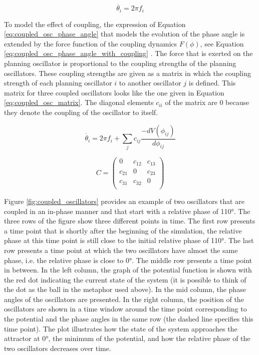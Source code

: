 \begin{equation}
\dot{\theta_i} =  2 \pi f_i
\label{eq:coupled_osc_phase_angle}
\end{equation}

To model the effect of coupling, the expression of Equation \ref{eq:coupled_osc_phase_angle} that models the evolution of the phase angle is extended by the force function of the coupling dynamics $F(\phi)$, see Equation \ref{eq:coupled_osc_phase_angle_with_coupling} \citep{Tilsen2017}. The force that is exerted on the planning oscillator is proportional to the coupling strengths of the planning oscillators. These coupling strengths are given as a matrix in which the coupling strength of each planning oscillator $i$ to another oscillator $j$ is defined. This matrix for three coupled oscillators looks like the one given in Equation \ref{eq:coupled_osc_matrix}. The diagonal elements $c_{ii}$ of the matrix are $0$ because they denote the coupling of the oscillator to itself.

\begin{equation}
\dot{\theta_i} =  2 \pi f_i + \sum_j{ c_{ij} \frac{-dV(\phi_{ij})}{d\phi_{ij}}}
\label{eq:coupled_osc_phase_angle_with_coupling}
\end{equation}

\begin{equation}
C = 
\begin{pmatrix}
0 & c_{12} & c_{13} \\
c_{21} & 0 & c_{23} \\
c_{31} & c_{32} & 0 \\
\end{pmatrix}
\label{eq:coupled_osc_matrix}
\end{equation}

Figure \ref{fig:coupled_oscillators} provides an example of two oscillators that are coupled in an in-phase manner and that start with a relative phase of 110°. The three rows of the figure show three different points in time. The first row presents a time point that is shortly after the beginning of the simulation, the relative phase at this time point is still close to the initial relative phase of 110°. The last row presents a time point at which the two oscillators have almost the same phase, i.e. the relative phase is close to 0°. The middle row presents a time point in between. In the left column, the graph of the potential function is shown with the red dot indicating the current state of the system (it is possible to think of the dot as the ball in the metaphor used above). In the mid column, the phase angles of the oscillators are presented. In the right column, the position of the oscillators are shown in a time window around the time point corresponding to the potential and the phase angles in the same row (the dashed line specifies this time point). The plot illustrates how the state of the system approaches the attractor at 0°, the minimum of the potential, and how the relative phase of the two oscillators decreases over time. 

